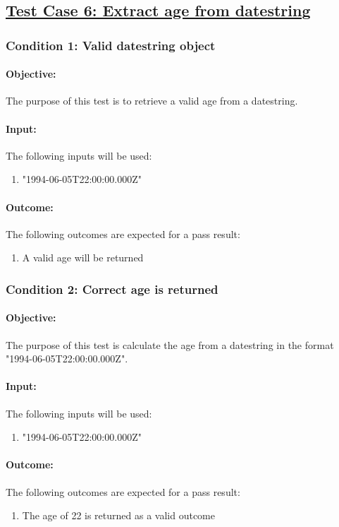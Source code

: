 \documentclass{article}
\begin{document}
\subsection{\underline{Test Case 6: Extract age from datestring}}\label{test6}
\subsubsection{Condition 1: Valid datestring object }
\paragraph{Objective:} The purpose of this test is to retrieve a valid age from a datestring.
\paragraph{Input:} The following inputs will be used:
\begin{enumerate}
	\item "1994-06-05T22:00:00.000Z"
\end{enumerate}
\paragraph{Outcome:} The following outcomes are expected for a pass result:
\begin{enumerate}
	\item A valid age will be returned
\end{enumerate}
\subsubsection{Condition 2: Correct age is returned  }
\paragraph{Objective:}  The purpose of this test is calculate the age from a datestring in the format "1994-06-05T22:00:00.000Z".
\paragraph{Input:} The following inputs will be used:
\begin{enumerate}
	\item "1994-06-05T22:00:00.000Z"
\end{enumerate}
\paragraph{Outcome:} The following outcomes are expected for a pass result:
\begin{enumerate}
	\item The age of 22 is returned as a valid outcome
\end{enumerate}
\end{document}
